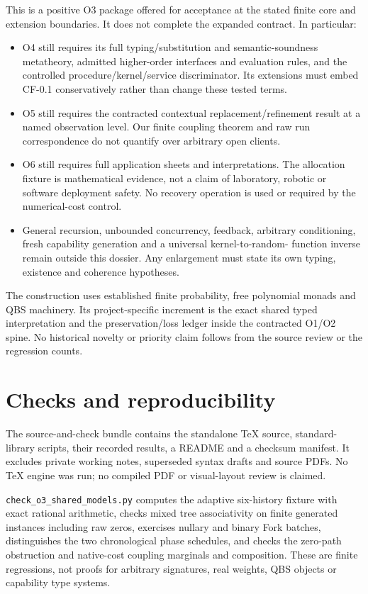 \documentclass[11pt,a4paper]{article}
\theoremstyle{definition}
\begin{document}
This is a positive O3 package offered for acceptance at the stated finite
core and extension boundaries. It does not complete the expanded contract.
In particular:
\begin{itemize}
\item O4 still requires its full typing/substitution and semantic-soundness
metatheory, admitted higher-order interfaces and evaluation rules, and the
controlled procedure/kernel/service discriminator. Its extensions must
embed CF-0.1 conservatively rather than change these tested terms.
\item O5 still requires the contracted contextual replacement/refinement
result at a named observation level. Our finite coupling theorem and raw
run correspondence do not quantify over arbitrary open clients.
\item O6 still requires full application sheets and interpretations. The
allocation fixture is mathematical evidence, not a claim of laboratory,
robotic or software deployment safety. No recovery operation is used or
required by the numerical-cost control.
\item General recursion, unbounded concurrency, feedback, arbitrary
conditioning, fresh capability generation and a universal kernel-to-random-
function inverse remain outside this dossier. Any enlargement must state
its own typing, existence and coherence hypotheses.
\end{itemize}
The construction uses established finite probability, free polynomial
monads and QBS machinery. Its project-specific increment is the exact
shared typed interpretation and the preservation/loss ledger inside the
contracted O1/O2 spine. No historical novelty or priority claim follows
from the source review or the regression counts.

\appendix
\section{Checks and reproducibility}\label{app:checks}
The source-and-check bundle contains the standalone TeX source, standard-
library scripts, their recorded results, a README and a checksum manifest.
It excludes private working notes, superseded syntax drafts and source
PDFs. No TeX engine was run; no compiled PDF or visual-layout review is
claimed.

\texttt{check\_o3\_shared\_models.py} computes the adaptive six-history
fixture with exact rational arithmetic, checks mixed tree associativity
on finite generated instances including raw zeros, exercises nullary and
binary Fork batches, distinguishes the two chronological phase schedules,
and checks the zero-path obstruction and native-cost coupling marginals
and composition. These are finite regressions, not proofs for arbitrary
signatures, real weights, QBS objects or capability type systems.
\end{document}
